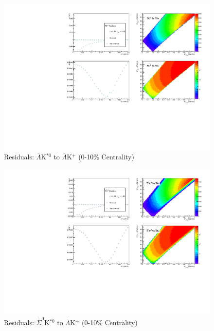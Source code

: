 \documentclass[../AnalysisNoteJBuxton.tex]{subfiles}
\begin{document}
\begin{figure}[h]
  \centering
  \includegraphics[width=\textwidth]{9_AdditionalFigures/Figures/Residuals/ALamKchP/Residuals_ALamKchP_0010_ALamKSt0_MomResCrctn_NonFlatBgdCrctn_ResidualsIncluded_UsingCoulombOnlyInterpCfs.pdf}
  \caption[Residuals: $\bar{\Lambda}$K$^{*0}$ to $\bar{\Lambda}$K$^{+}$ (0-10\% Centrality)]{Residuals: $\bar{\Lambda}$K$^{*0}$ to $\bar{\Lambda}$K$^{+}$ (0-10\% Centrality)}
  \label{fig:Res_ALamKchP_0010_ALamKSt0}
\end{figure}


\begin{figure}[h]
  \centering
  \includegraphics[width=\textwidth]{9_AdditionalFigures/Figures/Residuals/ALamKchP/Residuals_ALamKchP_0010_ASig0KSt0_MomResCrctn_NonFlatBgdCrctn_ResidualsIncluded_UsingCoulombOnlyInterpCfs.pdf}
  \caption[Residuals: $\bar{\Sigma}^{0}$K$^{*0}$ to $\bar{\Lambda}$K$^{+}$ (0-10\% Centrality)]{Residuals: $\bar{\Sigma}^{0}$K$^{*0}$ to $\bar{\Lambda}$K$^{+}$ (0-10\% Centrality)}
  \label{fig:Res_ALamKchP_0010_ASig0KSt0}
\end{figure}
\end{document}
